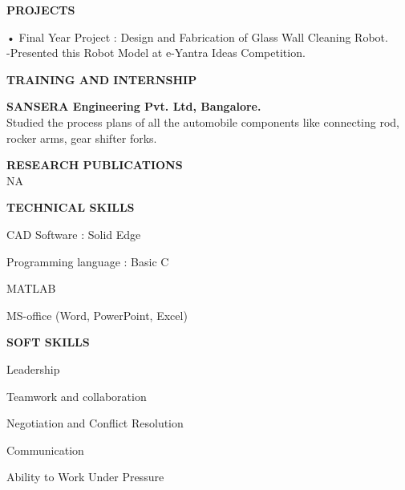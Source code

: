 \documentclass{article}
\begin{document}
\begin{center}

\textbf{\LARGE PROJECTS}
\begin{enumerate}
	
	{\large \item •	Final Year Project : Design and Fabrication of Glass Wall Cleaning Robot.\\
		-Presented this Robot Model at e-Yantra Ideas Competition.}
\end{enumerate}\vspace{15px}


\textbf{\LARGE TRAINING AND INTERNSHIP}
\begin{itemize}
	{\large \item \textbf{SANSERA Engineering Pvt. Ltd, Bangalore.}\\
		Studied the process plans of all the automobile
		components like connecting rod, rocker arms, gear shifter
		forks.}
\end{itemize}\vspace{15px}


\textbf{\LARGE RESEARCH PUBLICATIONS}\\NA\vspace{15px}


\textbf{\LARGE TECHNICAL SKILLS}
\begin{itemize}
	{\large \item CAD Software : Solid Edge}
	{\large \item Programming language : Basic C}
	{\large \item MATLAB }
	{\large \item MS-office (Word, PowerPoint, Excel)}
\end{itemize}\vspace{15px}


\textbf{\LARGE SOFT SKILLS}
\begin{enumerate}
	{\large \item Leadership}
	{\large \item Teamwork and collaboration }
	{\large \item  Negotiation and Conflict Resolution}
	{\large \item Communication }
	{\large \item Ability to Work Under Pressure }
\end{enumerate}\vspace{15px}


\end{center}
\end{document}
